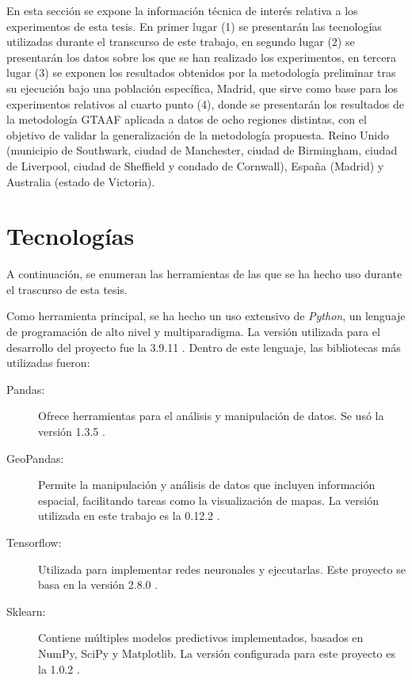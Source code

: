 \documentclass{uathesis-es}
\begin{document}
{	En esta sección se expone la información técnica de interés relativa a los experimentos de esta tesis. En primer lugar (1) se presentarán las tecnologías utilizadas durante el transcurso de este trabajo, en segundo lugar (2) se presentarán los datos sobre los que se han realizado los experimentos, en tercera lugar (3) se exponen los resultados obtenidos por la metodología preliminar tras su ejecución bajo una población específica, Madrid, que sirve como base para los experimentos relativos al cuarto punto (4), donde se presentarán los resultados de la metodología GTAAF aplicada a datos de ocho regiones distintas, con el objetivo de validar la generalización de la metodología propuesta. Reino Unido (municipio de Southwark, ciudad de Manchester, ciudad de Birmingham, ciudad de Liverpool, ciudad de Sheffield y condado de Cornwall), España (Madrid) y Australia (estado de Victoria).
	
	\section{Tecnologías}
	
	A continuación, se enumeran las herramientas de las que se ha hecho uso durante el trascurso de esta tesis.
	
	Como herramienta principal, se ha hecho un uso extensivo de \textit{Python}, un lenguaje de programación de alto nivel y multiparadigma. La versión utilizada para el desarrollo del proyecto fue la 3.9.11 \cite{Python}. Dentro de este lenguaje, las bibliotecas más utilizadas fueron:
	
	\begin{description}
		\item[Pandas:] Ofrece herramientas para el análisis y manipulación de datos. Se usó la versión 1.3.5 \cite{Pandas}.
		
		\item[GeoPandas:] Permite la manipulación y análisis de datos que incluyen información espacial, facilitando tareas como la visualización de mapas. La versión utilizada en este trabajo es la 0.12.2 \cite{GeoPandas}.
		
		\item[Tensorflow:] Utilizada para implementar redes neuronales y ejecutarlas. Este proyecto se basa en la versión 2.8.0 \cite{Tensorflow}.
		
		\item[Sklearn:] Contiene múltiples modelos predictivos implementados, basados en NumPy, SciPy y Matplotlib. La versión configurada para este proyecto es la 1.0.2 \cite{Scikit-Learn}.
		

\end{description}}
\end{document}
